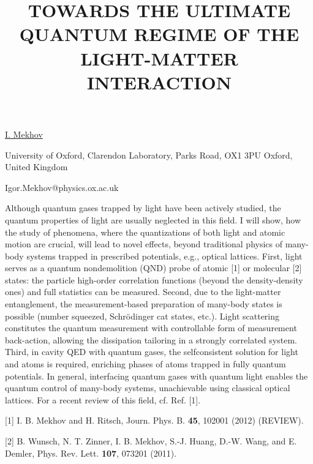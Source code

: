 \title{TOWARDS THE ULTIMATE QUANTUM REGIME OF THE LIGHT-MATTER INTERACTION}

\underline{I. Mekhov}

{\normalsize{\vspace{-4mm}
University of Oxford, Clarendon Laboratory, Parks Road, OX1 3PU Oxford, United Kingdom

\email Igor.Mekhov@physics.ox.ac.uk}}

Although quantum gases trapped by light have been actively studied, the quantum properties of light are usually neglected in this field. I will show, how the study of phenomena, where the quantizations of both light and atomic motion are crucial, will lead to novel effects, beyond traditional physics of many-body systems trapped in prescribed potentials, e.g., optical lattices. First, light serves as a quantum nondemolition (QND) probe of atomic [1] or molecular [2] states: the particle high-order correlation functions (beyond the density-density ones) and full statistics can be measured. Second, due to the light-matter entanglement, the measurement-based preparation of many-body states is possible (number squeezed, Schr\"odinger cat states, etc.). Light scattering constitutes the quantum measurement with controllable form of measurement back-action, allowing the dissipation tailoring in a strongly correlated system. Third, in cavity QED with quantum gases, the selfconsistent solution for light and atoms is required, enriching phases of atoms trapped in fully quantum potentials. In general, interfacing quantum gases with quantum light enables the quantum control of many-body systems, unachievable using classical optical lattices. For a recent review of this field, cf. Ref. [1].

{\normalsize
[1] I. B. Mekhov and H. Ritsch, Journ. Phys. B. \textbf{45}, 102001 (2012) (REVIEW).
\vsp

[2] B. Wunsch, N. T. Zinner, I. B. Mekhov, S.-J. Huang, D.-W. Wang, and E. Demler, Phys. Rev. Lett. \textbf{107}, 073201 (2011).
}

\vspace{\baselineskip} 